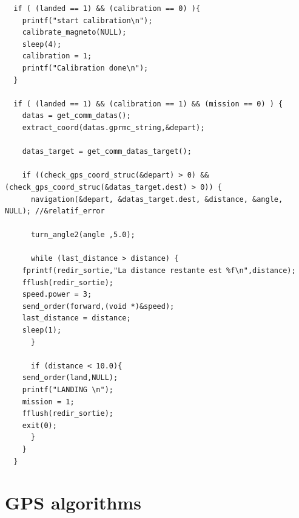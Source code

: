 \begin{lstlisting}
  if ( (landed == 1) && (calibration == 0) ){
    printf("start calibration\n");
    calibrate_magneto(NULL);
    sleep(4);
    calibration = 1;
    printf("Calibration done\n");
  }

  if ( (landed == 1) && (calibration == 1) && (mission == 0) ) {	  
    datas = get_comm_datas();	
    extract_coord(datas.gprmc_string,&depart);

    datas_target = get_comm_datas_target();
	
    if ((check_gps_coord_struc(&depart) > 0) && (check_gps_coord_struc(&datas_target.dest) > 0)) {
      navigation(&depart, &datas_target.dest, &distance, &angle, NULL); //&relatif_error
	
      turn_angle2(angle ,5.0);
	
      while (last_distance > distance) {
	fprintf(redir_sortie,"La distance restante est %f\n",distance);
	fflush(redir_sortie);
	speed.power = 3;
	send_order(forward,(void *)&speed);
	last_distance = distance;
	sleep(1);
      }

      if (distance < 10.0){
	send_order(land,NULL); 
	printf("LANDING \n");
	mission = 1;
	fflush(redir_sortie);
	exit(0);
      }	
    }
  }
\end{lstlisting}

\section{GPS algorithms}





